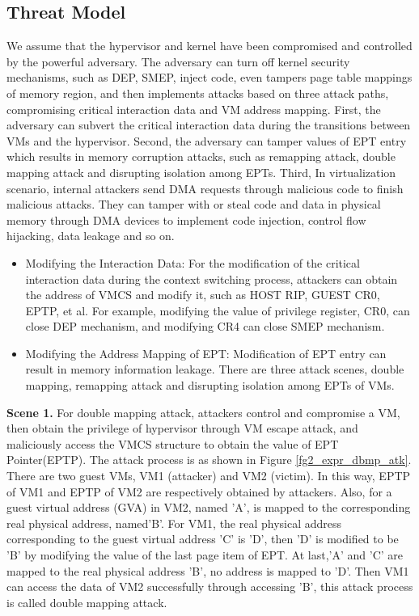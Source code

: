 \documentclass[10pt, numbers, preprint ]{sigplanconf}
\begin{document}
{\subsection{Threat Model} \label{subsec:thread_md}%
We assume that the hypervisor and kernel have been compromised and controlled by the powerful adversary. The adversary can turn off kernel security mechanisms, such as DEP, SMEP, inject code, even tampers page table mappings of memory region, and then implements attacks based on three attack paths, compromising critical interaction data and VM address mapping. First, the adversary can subvert the critical interaction data during the transitions between VMs and the hypervisor. Second, the adversary can tamper values of EPT entry which results in memory corruption attacks, such as remapping attack, double mapping attack and disrupting isolation among EPTs. Third, In virtualization scenario, internal attackers send DMA requests through malicious code to finish malicious attacks. They can tamper with or steal code and data in physical memory through DMA devices to implement code injection, control flow hijacking, data leakage and so on.

\begin{itemize}
\item Modifying the Interaction Data: For the modification of the critical interaction data during the context switching process, attackers can obtain the address of VMCS and modify it, such as HOST RIP, GUEST CR0, EPTP, et al. For example, modifying the value of privilege register, CR0, can close DEP mechanism, and modifying CR4 can close SMEP mechanism.
\item Modifying the Address Mapping of EPT: Modification of EPT entry can result in memory information leakage. There are three attack scenes, double mapping, remapping attack and disrupting isolation among EPTs of VMs.
\end{itemize}

\textbf{Scene 1.} For double mapping attack, attackers control and compromise a VM, then obtain the privilege of hypervisor through VM escape attack, and maliciously access the VMCS structure to obtain the value of EPT Pointer(EPTP). The attack process is as shown in Figure \ref{fg2_expr_dbmp_atk}. There are two guest VMs, VM1 (attacker) and VM2 (victim). In this way, EPTP of VM1 and EPTP of VM2 are respectively obtained by attackers. Also, for a guest virtual address (GVA) in VM2, named ’A’, is mapped to the corresponding real physical address, named’B’. For VM1, the real physical address corresponding to the guest virtual address ’C’ is ’D’, then ’D’ is modified to be ’B’ by modifying the value of the last page item of EPT. At last,’A’ and ’C’ are mapped to the real physical address ’B’, no address is mapped to ’D’. Then VM1 can access the data of VM2 successfully through accessing ’B’, this attack process is called double mapping attack.

}
\end{document}
